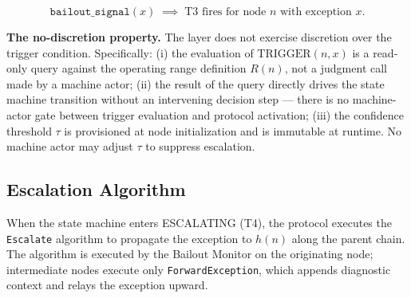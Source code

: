 \begin{equation}
\texttt{bailout\_signal}(x) \; \implies\; \text{T3 fires for node } n \text{ with exception } x. \tag{TC-secondary}
\end{equation}

\medskip\noindent\textbf{The no-discretion property.} The \bounds{} layer does not exercise discretion over the trigger condition. Specifically: (i) the evaluation of $\text{TRIGGER}(n, x)$ is a read-only query against the operating range definition $R(n)$, not a judgment call made by a machine actor; (ii) the result of the query directly drives the state machine transition without an intervening decision step — there is no machine-actor gate between trigger evaluation and protocol activation; (iii) the confidence threshold $\tau$ is provisioned at node initialization and is immutable at runtime. No machine actor may adjust $\tau$ to suppress escalation.

\subsection{Escalation Algorithm}\label{sec:escalation-algorithm}

When the state machine enters ESCALATING (T4), the protocol executes the \texttt{Escalate} algorithm to propagate the exception to $h(n)$ along the parent chain. The algorithm is executed by the Bailout Monitor on the originating node; intermediate nodes execute only \texttt{ForwardException}, which appends diagnostic context and relays the exception upward.

